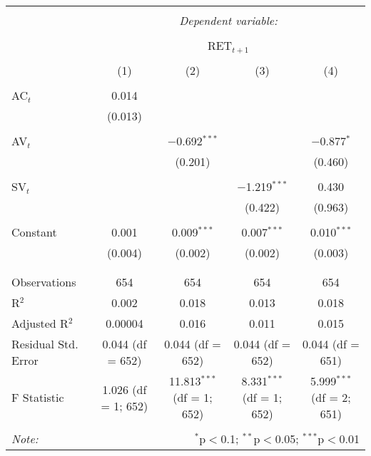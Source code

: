 
\begin{table}[!htbp] \centering 
  \caption{} 
  \label{} 
\begin{tabular}{@{\extracolsep{5pt}}lcccc} 
\\[-1.8ex]\hline 
\hline \\[-1.8ex] 
 & \multicolumn{4}{c}{\textit{Dependent variable:}} \\ 
\cline{2-5} 
\\[-1.8ex] & \multicolumn{4}{c}{RET$_{t+1}$} \\ 
\\[-1.8ex] & (1) & (2) & (3) & (4)\\ 
\hline \\[-1.8ex] 
 AC$_{t}$ & 0.014 &  &  &  \\ 
  & (0.013) &  &  &  \\ 
  & & & & \\ 
 AV$_{t}$ &  & $-$0.692$^{***}$ &  & $-$0.877$^{*}$ \\ 
  &  & (0.201) &  & (0.460) \\ 
  & & & & \\ 
 SV$_{t}$ &  &  & $-$1.219$^{***}$ & 0.430 \\ 
  &  &  & (0.422) & (0.963) \\ 
  & & & & \\ 
 Constant & 0.001 & 0.009$^{***}$ & 0.007$^{***}$ & 0.010$^{***}$ \\ 
  & (0.004) & (0.002) & (0.002) & (0.003) \\ 
  & & & & \\ 
\hline \\[-1.8ex] 
Observations & 654 & 654 & 654 & 654 \\ 
R$^{2}$ & 0.002 & 0.018 & 0.013 & 0.018 \\ 
Adjusted R$^{2}$ & 0.00004 & 0.016 & 0.011 & 0.015 \\ 
Residual Std. Error & 0.044 (df = 652) & 0.044 (df = 652) & 0.044 (df = 652) & 0.044 (df = 651) \\ 
F Statistic & 1.026 (df = 1; 652) & 11.813$^{***}$ (df = 1; 652) & 8.331$^{***}$ (df = 1; 652) & 5.999$^{***}$ (df = 2; 651) \\ 
\hline 
\hline \\[-1.8ex] 
\textit{Note:}  & \multicolumn{4}{r}{$^{*}$p$<$0.1; $^{**}$p$<$0.05; $^{***}$p$<$0.01} \\ 
\end{tabular} 
\end{table} 
